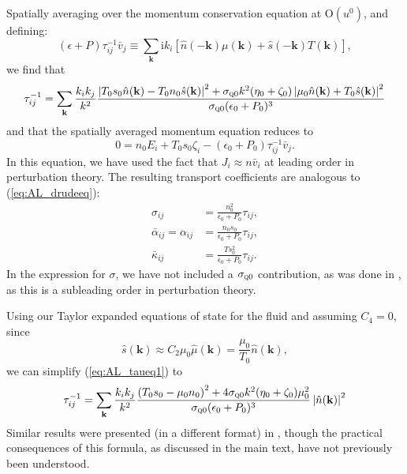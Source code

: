 Spatially averaging over the momentum conservation equation at $\mathrm{O}(u^0)$, and defining: 
\begin{equation}
(\epsilon+P)\tau^{-1}_{ij}  \bar v_j \equiv  \sum_{\mathbf{k}} \mathrm{i}k_i \left[\hat n(-\mathbf{k})  \mu(\mathbf{k}) + \hat s(-\mathbf{k})  T(\mathbf{k})\right],
\end{equation}
we find that \begin{equation}
\tau^{-1}_{ij} = \sum_{\mathbf{k}} \frac{k_ik_j}{k^2} \frac{\left| T_0s_0 \hat n(\mathbf{k}) - T_0n_0 \hat s(\mathbf{k})\right|^2 + \sigma_{\textsc{q}0}k^2 (\eta_0+\zeta_0) \left|\mu_0 \hat n(\mathbf{k}) + T_0\hat s(\mathbf{k})\right|^2}{\sigma_{\textsc{q}0}(\epsilon_0+P_0)^3}   \label{eq:AL_taueq1}
\end{equation}and that the spatially averaged momentum equation reduces to \begin{equation}
0  = n_0  E_i + T_0s_0  \zeta_i -(\epsilon_0+P_0)\tau^{-1}_{ij} \bar v_j .  \label{eq:AL_hydrocpeq}
\end{equation}
In this equation, we have used the fact that $ J_i \approx n \bar v_i$ at leading order in perturbation theory.   The resulting transport coefficients are analogous to (\ref{eq:AL_drudeeq}): \begin{subequations}\begin{align}
\sigma_{ij} &= \frac{n_0^2}{\epsilon_0+P_0}  \tau_{ij}, \\
\bar\alpha_{ij} = \alpha_{ij} &=  \frac{n_0s_0}{\epsilon_0+P_0}\tau_{ij}, \\
\bar\kappa_{ij} &= \frac{Ts_0^2}{\epsilon_0+P_0}\tau_{ij}.
\end{align}\end{subequations}In the expression for $\sigma$, we have not included a $\sigma_{\textsc{q}0}$ contribution, as was done in \cite{hartnoll_theory_2007}, as this is a subleading order in perturbation theory.

Using our Taylor expanded equations of state for the fluid and assuming $C_4=0$, since \begin{equation}
\hat s(\mathbf{k}) \approx C_2 \mu_0 \hat\mu(\mathbf{k}) = \frac{\mu_0}{T_0}\hat n(\mathbf{k}),
\end{equation}we can simplify (\ref{eq:AL_taueq1}) to \begin{equation}
\tau^{-1}_{ij} = \sum_{\mathbf{k}} \frac{k_ik_j}{k^2} \frac{\left(T_0s_0-\mu_0n_0\right)^2 +4 \sigma_{\textsc{q}0}k^2 (\eta_0+\zeta_0) \mu_0^2 }{\sigma_{\textsc{q}0}(\epsilon_0+P_0)^3}\left|\hat n(\mathbf{k})\right|^2
\end{equation}
Similar results were presented (in a different format) in \cite{davison_holographic_2014}, though the practical consequences of this formula, as discussed in the main text, have not previously been understood.


